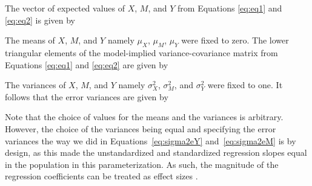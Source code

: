 \documentclass[man]{apa7}\usepackage[]{graphicx}\usepackage[]{xcolor}
\begin{document}
The vector of expected values of ${X}$, ${M}$, and ${Y}$ from Equations \ref{eq:eq1} and \ref{eq:eq2} is given by



\noindent The means of ${X}$, ${M}$, and ${Y}$
namely $\mu_{X}$, $\mu_{M}$, $\mu_{Y}$ were fixed to zero.
The lower triangular elements
of the model-implied variance-covariance matrix
from Equations \ref{eq:eq1} and \ref{eq:eq2} are given by



\noindent The variances of ${X}$, ${M}$, and ${Y}$
namely $\sigma_{X}^{2}$, $\sigma_{M}^{2}$, and $\sigma_{Y}^{2}$
were fixed to one.
It follows that the error variances are given by





\noindent Note that the choice of values for the means and the variances is arbitrary.
However, the choice of the variances being equal and specifying the error variances the way we did in Equations~\ref{eq:sigma2eY} and~\ref{eq:sigma2eM}
is by design, as this made the unstandardized and standardized regression slopes equal in the population in this parameterization.
As such, the magnitude of the regression coefficients can be treated as effect sizes
\parencite{Lib-Mediation-Profile-Likelihood-Cheung-2009a}.
\end{document}
